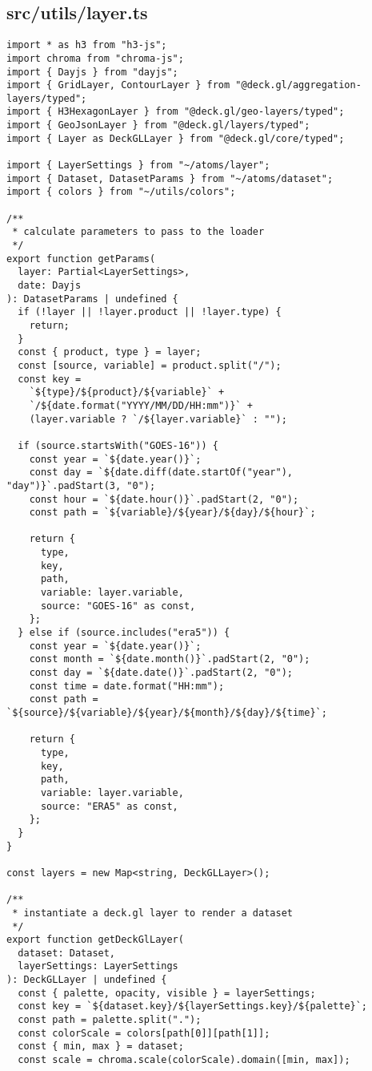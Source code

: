 \subsection{src/utils/layer.ts}
\begin{verbatim}
import * as h3 from "h3-js";
import chroma from "chroma-js";
import { Dayjs } from "dayjs";
import { GridLayer, ContourLayer } from "@deck.gl/aggregation-layers/typed";
import { H3HexagonLayer } from "@deck.gl/geo-layers/typed";
import { GeoJsonLayer } from "@deck.gl/layers/typed";
import { Layer as DeckGLLayer } from "@deck.gl/core/typed";

import { LayerSettings } from "~/atoms/layer";
import { Dataset, DatasetParams } from "~/atoms/dataset";
import { colors } from "~/utils/colors";

/**
 * calculate parameters to pass to the loader
 */
export function getParams(
  layer: Partial<LayerSettings>,
  date: Dayjs
): DatasetParams | undefined {
  if (!layer || !layer.product || !layer.type) {
    return;
  }
  const { product, type } = layer;
  const [source, variable] = product.split("/");
  const key =
    `${type}/${product}/${variable}` +
    `/${date.format("YYYY/MM/DD/HH:mm")}` +
    (layer.variable ? `/${layer.variable}` : "");

  if (source.startsWith("GOES-16")) {
    const year = `${date.year()}`;
    const day = `${date.diff(date.startOf("year"), "day")}`.padStart(3, "0");
    const hour = `${date.hour()}`.padStart(2, "0");
    const path = `${variable}/${year}/${day}/${hour}`;

    return {
      type,
      key,
      path,
      variable: layer.variable,
      source: "GOES-16" as const,
    };
  } else if (source.includes("era5")) {
    const year = `${date.year()}`;
    const month = `${date.month()}`.padStart(2, "0");
    const day = `${date.date()}`.padStart(2, "0");
    const time = date.format("HH:mm");
    const path = `${source}/${variable}/${year}/${month}/${day}/${time}`;

    return {
      type,
      key,
      path,
      variable: layer.variable,
      source: "ERA5" as const,
    };
  }
}

const layers = new Map<string, DeckGLLayer>();

/**
 * instantiate a deck.gl layer to render a dataset
 */
export function getDeckGlLayer(
  dataset: Dataset,
  layerSettings: LayerSettings
): DeckGLLayer | undefined {
  const { palette, opacity, visible } = layerSettings;
  const key = `${dataset.key}/${layerSettings.key}/${palette}`;
  const path = palette.split(".");
  const colorScale = colors[path[0]][path[1]];
  const { min, max } = dataset;
  const scale = chroma.scale(colorScale).domain([min, max]);


\end{verbatim}
